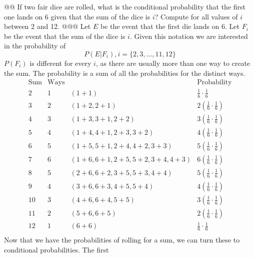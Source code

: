 \documentclass[10pt]{article}
\begin{document}
\begin{easylist}[enumerate]
    @@ If two fair dice are rolled, what is the conditional probability that the first one lands on 6 given that the sum
    of the dice is $i$? Compute for all values of $i$ between 2 and 12.
    @@@ Let $E$ be the event that the first die lands on 6. Let $F_i$ be the event that the sum of the dice is $i$.
    Given this notation we are interested in the probability of
        \[ P(E|F_i), i = \{ 2, 3, \ldots, 11, 12 \} \]
    $P(F_i)$ is different for every $i$, as there are usually more than one way to create the sum. The probability is a
    sum of all the probabilities for the distinct ways.
        \[
            \begin{array}{cccc}
                \text{Sum} & \text{Ways} & & \text{Probability}\\
                2  & 1 & (1 + 1)                                    & \frac{1}{6} \cdot \frac{1}{6}\\
                3  & 2 & (1 + 2, 2 + 1)                             & 2 \left( \frac{1}{6} \cdot \frac{1}{6} \right)\\
                4  & 3 & (1 + 3, 3 + 1, 2 + 2)                      & 3 \left( \frac{1}{6} \cdot \frac{1}{6} \right)\\
                5  & 4 & (1 + 4, 4 + 1, 2 + 3, 3 + 2)               & 4 \left( \frac{1}{6} \cdot \frac{1}{6} \right)\\
                6  & 5 & (1 + 5, 5 + 1, 2 + 4, 4 + 2, 3 + 3)        & 5 \left( \frac{1}{6} \cdot \frac{1}{6} \right)\\
                7  & 6 & (1 + 6, 6 + 1, 2 + 5, 5 + 2, 3 + 4, 4 + 3) & 6 \left( \frac{1}{6} \cdot \frac{1}{6} \right)\\
                8  & 5 & (2 + 6, 6 + 2, 3 + 5, 5 + 3, 4 + 4)        & 5 \left( \frac{1}{6} \cdot \frac{1}{6} \right)\\
                9  & 4 & (3 + 6, 6 + 3, 4 + 5, 5 + 4)               & 4 \left( \frac{1}{6} \cdot \frac{1}{6} \right)\\
                10 & 3 & (4 + 6, 6 + 4, 5 + 5)                      & 3 \left( \frac{1}{6} \cdot \frac{1}{6} \right)\\
                11 & 2 & (5 + 6, 6 + 5)                             & 2 \left( \frac{1}{6} \cdot \frac{1}{6} \right)\\
                12 & 1 & (6 + 6)                                    & \frac{1}{6} \cdot \frac{1}{6}\\
            \end{array}
        \]
    Now that we have the probabilities of rolling for a sum, we can turn these to conditional probabilities. The first

\end{easylist}
\end{document}

